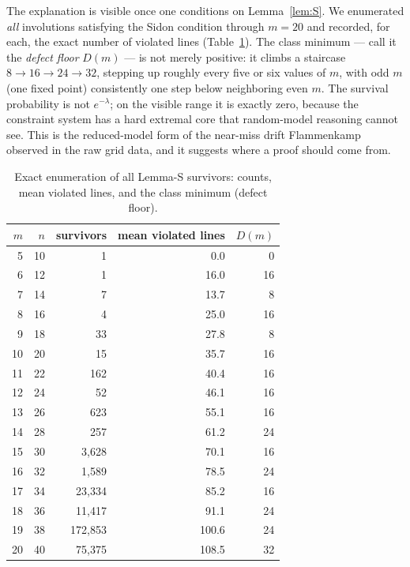 \documentclass[11pt]{article}
\theoremstyle{remark}
\begin{document}
The explanation is visible once one conditions on Lemma~\ref{lem:S}.
We enumerated \emph{all} involutions satisfying the Sidon condition through
$m=20$ and recorded, for each, the exact number of violated lines
(Table~\ref{tab:defect}).
The class minimum --- call it the \emph{defect floor} $D(m)$ ---
is not merely positive:
it climbs a staircase $8\to16\to24\to32$,
stepping up roughly every five or six values of $m$,
with odd $m$ (one fixed point) consistently one step below neighboring even
$m$.
The survival probability is not $e^{-\lambda}$;
on the visible range it is exactly zero,
because the constraint system has a hard extremal core that random-model
reasoning cannot see.
This is the reduced-model form of the near-miss drift Flammenkamp observed
in the raw grid data,
and it suggests where a proof should come from.

\begin{table}[t]
\centering
\caption{Exact enumeration of all Lemma-S survivors:
counts, mean violated lines, and the class minimum (defect floor).}
\label{tab:defect}
\begin{tabular}{rrrrr}
\toprule
$m$ & $n$ & survivors & mean violated lines & $D(m)$\\
\midrule
 5 & 10 &          1 &   0.0 &  0\\
 6 & 12 &          1 &  16.0 & 16\\
 7 & 14 &          7 &  13.7 &  8\\
 8 & 16 &          4 &  25.0 & 16\\
 9 & 18 &         33 &  27.8 &  8\\
10 & 20 &         15 &  35.7 & 16\\
11 & 22 &        162 &  40.4 & 16\\
12 & 24 &         52 &  46.1 & 16\\
13 & 26 &        623 &  55.1 & 16\\
14 & 28 &        257 &  61.2 & 24\\
15 & 30 &      3{,}628 &  70.1 & 16\\
16 & 32 &      1{,}589 &  78.5 & 24\\
17 & 34 &     23{,}334 &  85.2 & 16\\
18 & 36 &     11{,}417 &  91.1 & 24\\
19 & 38 &    172{,}853 & 100.6 & 24\\
20 & 40 &     75{,}375 & 108.5 & 32\\
\bottomrule
\end{tabular}
\end{table}
\end{document}
